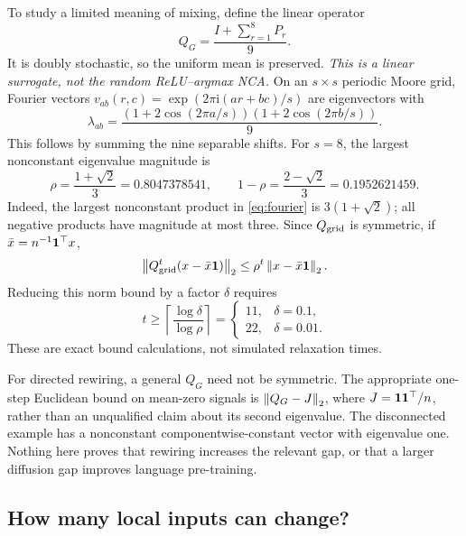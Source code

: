 To study a limited meaning of mixing, define the linear operator
\begin{equation}
 Q_G=\frac{I+\sum_{r=1}^{8}P_r}{9}.
 \label{eq:diffusion}
\end{equation}
It is doubly stochastic, so the uniform mean is preserved.
\emph{This is a linear surrogate, not the random ReLU--argmax NCA.}
On an $s\times s$ periodic Moore grid, Fourier vectors
$v_{ab}(r,c)=\exp(2\pi\mathrm i(ar+bc)/s)$ are eigenvectors with
\begin{equation}
 \lambda_{ab}=
 \frac{(1+2\cos(2\pi a/s))(1+2\cos(2\pi b/s))}{9}.
 \label{eq:fourier}
\end{equation}
This follows by summing the nine separable shifts.
For $s=8$, the largest nonconstant eigenvalue magnitude is
\begin{equation}
 \rho=\frac{1+\sqrt2}{3}=0.8047378541,\qquad
 1-\rho=\frac{2-\sqrt2}{3}=0.1952621459.
\end{equation}
Indeed, the largest nonconstant product in \eqref{eq:fourier} is
$3(1+\sqrt2)$; all negative products have magnitude at most three.
Since $Q_{\rm grid}$ is symmetric, if $\bar x=n^{-1}\mathbf{1}^\top x$,
\begin{equation}
 \left\lVert Q_{\rm grid}^t(x-\bar x\mathbf{1})\right\rVert_2
 \leq \rho^t\left\lVert x-\bar x\mathbf{1}\right\rVert_2.
\end{equation}
Reducing this norm bound by a factor $\delta$ requires
\begin{equation}
 t\geq\left\lceil\frac{\log\delta}{\log\rho}\right\rceil
 =\begin{cases}11,&\delta=0.1,\\22,&\delta=0.01.\end{cases}
\end{equation}
These are exact bound calculations, not simulated relaxation times.

For directed rewiring, a general $Q_G$ need not be symmetric.
The appropriate one-step Euclidean bound on mean-zero signals is
$\left\lVert Q_G-J\right\rVert_2$, where $J=\mathbf{1}\mathbf{1}^\top/n$, rather than an unqualified
claim about its second eigenvalue. The disconnected example has a
nonconstant componentwise-constant vector with eigenvalue one.
Nothing here proves that rewiring increases the relevant gap, or that a
larger diffusion gap improves language pre-training.

\subsection{How many local inputs can change?}

